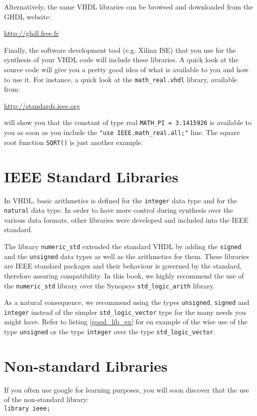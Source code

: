 \noindent
Alternatively, the same VHDL libraries can be browsed and downloaded from the GHDL website:

\noindent
\url{http://ghdl.free.fr}

\noindent
Finally, the software development tool (e.g. Xilinx ISE) that you use for the synthesis of your VHDL code will include these libraries. A quick look at the source code will give you a pretty good idea of what is available to you and how to use it. For instance, a quick look at the \texttt{math\_real.vhdl} library, available from: 

\noindent
\url{http://standards.ieee.org}

\noindent
will show you that the constant of type real \texttt{MATH\_PI = 3.1415926} is available to you as soon as you include the \texttt{"use IEEE.math\_real.all;"} line. The square root function \texttt{SQRT()} is just another example.

\section{IEEE Standard Libraries}
In VHDL, basic arithmetics is defined for the \texttt{integer} data type and for the \texttt{natural} data type. In order to have more control during synthesis over the various data formats, other libraries were developed and included into the IEEE standard.

The library \texttt{numeric\_std} extended the standard VHDL by adding the \texttt{signed} and the \texttt{unsigned} data types as well as the arithmetics for them. These libraries are IEEE standard packages and their behaviour is governed by the standard, therefore assuring compatibility. In this book, we highly recommend the use of the \texttt{numeric\_std} library over the Synopsys \texttt{std\_logic\_arith} library.

As a natural consequence, we recommend using the types \texttt{unsigned}, \texttt{signed} and \texttt{integer} instead of the simpler \texttt{std\_logic\_vector} type for the many needs you might have. Refer to listing \ref{good_lib_ex} for en example of the wise use of the type \texttt{unsigned} or the type \texttt{integer} over the type \texttt{std\_logic\_vector}.

\section{Non-standard Libraries}
If {you often use google for learning purposes}, you will soon discover that the use of the non-standard library:\\
\texttt{library ieee;}

